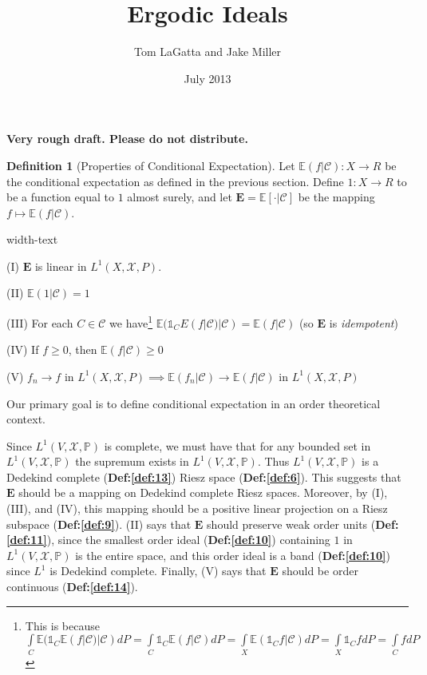 \documentclass[letterpaper,10pt,oneside,onecolumn,reqno]{amsart}
\author{Tom LaGatta and Jake Miller}
\title{Ergodic Ideals}
\date{July 2013}
\newcommand{\C}{\mathcal C}
\newcommand{\E}{\mathbb E}
\renewcommand{\P}{\mathbb P}
\newcommand{\X}{\mathcal X}
\newcommand{\one}{\mathds{1}}      %
\theoremstyle{definition}
\newtheorem{defn}{Definition}
\begin{document}
\maketitle

\textbf{Very rough draft. Please do not distribute.}
\begin{defn}[Properties of Conditional Expectation]
  \label{def:1}
  Let $\E(f|\C) : X \to R$ be the conditional expectation as defined
  in the previous section. Define $1 : X \to R$ to be a function
  equal to $1$ almost surely, and let $\mathbf{E}=\E[\cdot|\C]$ be the
  mapping $f \mapsto \E(f|\C)$.
  \begin{deflist}{width-text}
  \item[(I)] $\mathbf{E}$ is linear in $L^1(X,\X,P)$.
  \item[(II)] $\E(1|\C) = 1$
  \item[(III)] For each $C \in \C$ we have\footnote{This is because
      $\int\limits_C\E(\one_C \E(f|\C)|\C)dP=\int\limits_C \one_C
      \E(f|\C)dP=\int\limits_X \E(\one_C f | \C)dP=\int\limits_X
      \one_C fdP=\int\limits_C fdP$ \label{fn:1}} $\E(\one_C
    E(f|\C)|\C) = \E(f|\C)$ (so $\mathbf{E}$ is \emph{idempotent})
  \item[(IV)] If $f \geq 0$, then $\E(f|\C) \geq 0$
  \item[(V)] $f_n \rightarrow f$ in $L^1(X,\X,P) \implies \E(f_n|\C)
    \rightarrow \E(f|\C)$ in $L^1(X,\X,P)$
  \end{deflist}
\end{defn}

Our primary goal is to define conditional expectation in an order
theoretical context.

\begin{framed}
  Since $L^1(V,\X,\P)$ is complete, we must have that for any bounded
  set in $L^1(V,\X,\P)$ the supremum exists in $L^1(V,\X,\P)$. Thus
  $L^1(V,\X,\P)$ is a Dedekind complete (\textbf{Def:\ref{def:13}})
  Riesz space (\textbf{Def:\ref{def:6}}). This suggests that
  $\mathbf{E}$ should be a mapping on Dedekind complete Riesz
  spaces. Moreover, by (I), (III), and (IV), this mapping should be a
  positive linear projection on a
  Riesz subspace (\textbf{Def:\ref{def:9}}). (II) says that
  $\mathbf{E}$ should preserve weak order units
  (\textbf{Def:\ref{def:11}}), since the smallest order ideal
  (\textbf{Def:\ref{def:10}}) containing $1$ in $L^1(V,\X,\P)$ is the
  entire space, and this order ideal is a band (\textbf{Def:\ref{def:10}})
  since $L^1$ is Dedekind complete. Finally, (V) says that
  $\mathbf{E}$ should be order continuous (\textbf{Def:\ref{def:14}}).
\end{framed}
\end{document}
